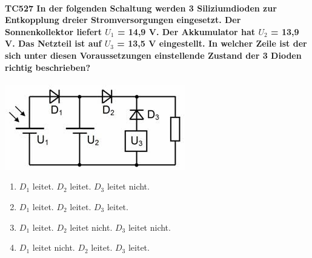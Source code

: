 \documentclass[8pt]{article}
\begin{document}
\begin{enumerate}
\begin{enumerate}[nolistsep,label=\Alph*]
{\begin{enumerate}[nolistsep,label=\Alph*]
\paragraph*{TC527 In der folgenden Schaltung werden 3 Siliziumdioden zur Entkopplung dreier Stromversorgungen eingesetzt. Der Sonnenkollektor liefert $U_{1}$ = 14,9 V. Der Akkumulator hat $U_{2}$ = 13,9 V. Das Netzteil ist auf $U_{3}$ = 13,5 V eingestellt. In welcher Zeile ist der sich unter diesen Voraussetzungen einstellende Zustand der 3 Dioden richtig beschrieben?}
\begin{center}
	\begin{minipage}{\linewidth}
		\centering
		\includegraphics[scale=1.0]{pics/tc527_a.jpg}
	\end{minipage}
\end{center}
\begin{enumerate}[nolistsep,label=\Alph*]
\item $D_{1}$ leitet. $D_{2}$ leitet. $D_{3}$ leitet nicht.
\item $D_{1}$ leitet. $D_{2}$ leitet. $D_{3}$ leitet.
\item $D_{1}$ leitet. $D_{2}$ leitet nicht. $D_{3}$ leitet nicht.
\item $D_{1}$ leitet nicht. $D_{2}$ leitet. $D_{3}$ leitet.
\end{enumerate}


\end{enumerate}}
\end{enumerate}
\end{enumerate}
\end{document}

